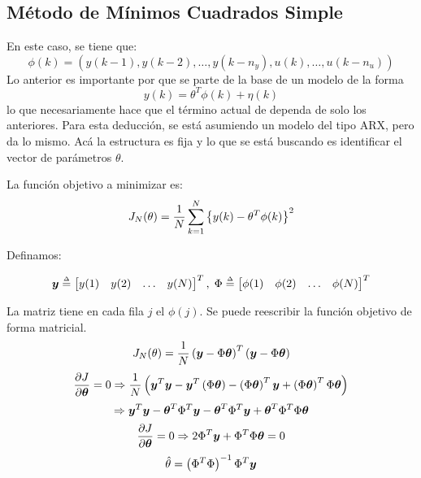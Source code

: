 \documentclass{article}
\begin{document}
\subsection{Método de Mínimos Cuadrados Simple}
En este caso, se tiene que:
$$\phi(k) = (y(k-1),y(k-2),\ldots,y(k-n_y),u(k),\ldots,u(k-n_u))$$
Lo anterior es importante por que se parte de la base de un modelo de la forma
$$y(k) = \theta^T\phi(k)+\eta(k)$$
lo que necesariamente hace que el término actual de dependa de solo los anteriores. Para esta deducción, se está asumiendo un modelo del tipo ARX, pero da lo mismo. Acá la estructura es fija y lo que se está buscando es identificar el vector de parámetros $\theta$.

La función objetivo a minimizar es:
$$J_N(\theta) = \frac{1}{N}\sum_{k = 1}^{N}\left\lbrace y(k)-\theta^T\phi(k) \right\rbrace^2$$

Definamos:

$$\bs{y} \delequal \begin{bmatrix}
y(1) & y(2) & \ldots & y(N)
\end{bmatrix}^T ,\; \Phi \delequal \begin{bmatrix}
\phi(1) & \phi(2) & \ldots & \phi(N)
\end{bmatrix}^T$$

La matriz tiene en cada fila $j$ el $\phi(j)$. Se puede reescribir la función objetivo de forma matricial.
$$J_N(\theta) = \frac{1}{N}\left( \boldsymbol{y}-\Phi\boldsymbol{\theta} \right)^T\left( \boldsymbol{y}-\Phi\boldsymbol{\theta} \right)$$
$$\frac{\partial J}{\partial\boldsymbol{\theta}} = 0 \Rightarrow \frac{1}{N}\left( \boldsymbol{y}^T\boldsymbol{y}-\boldsymbol{y}^T\left( \Phi \boldsymbol{\theta} \right)-\left( \Phi \boldsymbol{\theta} \right)^T\boldsymbol{y}+\left( \Phi \boldsymbol{\theta} \right)^T\Phi \boldsymbol{\theta} \right)$$
$$\Rightarrow \boldsymbol{y}^T\boldsymbol{y}-\boldsymbol{\theta}^T\Phi^T\boldsymbol{y}-\boldsymbol{\theta}^T\Phi^T\boldsymbol{y}+\boldsymbol{\theta}^T\Phi^T \Phi \boldsymbol{\theta}$$
$$\frac{\partial J}{\partial\boldsymbol{\theta}} = 0 \Rightarrow 2\Phi^T\boldsymbol{y}+\Phi^T \Phi \boldsymbol{\theta} = 0$$
$$\hat{\theta} = \left( \Phi^T \Phi \right)^{-1}\Phi^T\boldsymbol{y}$$
\end{document}
